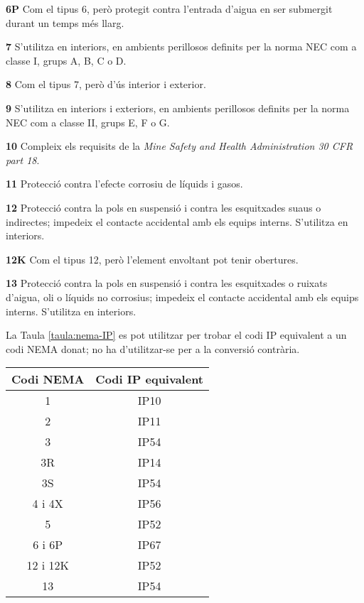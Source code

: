 \begin{list}{}
   \item[\textbf{6P}] Com el tipus 6, però protegit contra l'entrada d'aigua en ser submergit durant un temps més llarg.
   \item[\textbf{7}] S'utilitza en interiors, en ambients perillosos definits per la norma NEC com a classe I, grups A, B, C o D.
   \item[\textbf{8}] Com el tipus 7, però d'ús interior i exterior.
   \item[\textbf{9}] S'utilitza en interiors i exteriors, en ambients perillosos definits per la norma NEC com a classe II, grups E, F o G.
   \item[\textbf{10}] Compleix els requisits de la \textit{Mine Safety and Health Administration 30 CFR part 18}.
   \item[\textbf{11}] Protecció contra l'efecte corrosiu de líquids i gasos.
   \item[\textbf{12}] Protecció contra la pols en suspensió i contra les esquitxades suaus o indirectes; impedeix el contacte accidental amb els equips interns. S'utilitza en interiors.
   \item[\textbf{12K}] Com el tipus 12, però l'element envoltant pot tenir obertures.
   \item[\textbf{13}] Protecció contra la pols en suspensió i contra les esquitxades o ruixats d'aigua, oli o líquids no corrosius; impedeix el contacte accidental amb els equips interns. S'utilitza en interiors.
\end{list}



La Taula \vref{taula:nema-IP} es pot utilitzar per trobar el codi IP equivalent a un codi NEMA donat; no ha d'utilitzar-se per a la conversió contrària.

\begin{center}
   \label{taula:nema-IP}
   \begin{tabular}{cc}
   \toprule[1pt]
   Codi NEMA & Codi IP equivalent \\
   \midrule
   1 & IP10 \\
   2 & IP11 \\
   3 & IP54 \\
   3R & IP14 \\
   3S & IP54 \\
   4 i 4X & IP56 \\
   5 & IP52 \\
   6 i 6P & IP67\\
   12 i 12K & IP52 \\
   13 & IP54 \\
   \bottomrule[1pt]
   \end{tabular}
\end{center}


